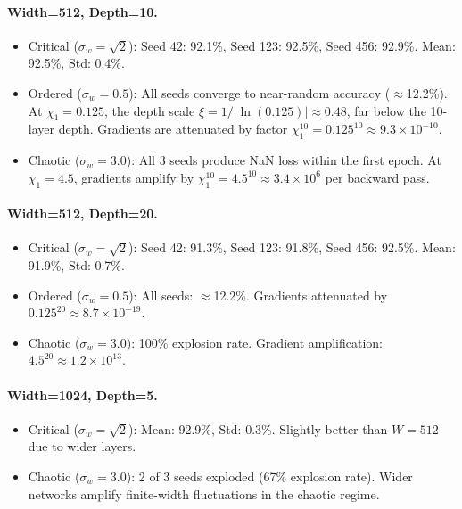 \documentclass[10pt]{article}
\begin{document}
\paragraph{Width=512, Depth=10.}
\begin{itemize}[nosep]
    \item Critical ($\sigma_w = \sqrt{2}$):
    Seed 42: 92.1\%, Seed 123: 92.5\%, Seed 456: 92.9\%.
    Mean: 92.5\%, Std: 0.4\%.
    \item Ordered ($\sigma_w = 0.5$):
    All seeds converge to near-random accuracy ($\approx$12.2\%).
    At $\chi_1 = 0.125$, the depth scale $\xi = 1/|\ln(0.125)| \approx 0.48$, far below the 10-layer depth.
    Gradients are attenuated by factor $\chi_1^{10} = 0.125^{10} \approx 9.3 \times 10^{-10}$.
    \item Chaotic ($\sigma_w = 3.0$):
    All 3 seeds produce NaN loss within the first epoch.
    At $\chi_1 = 4.5$, gradients amplify by $\chi_1^{10} = 4.5^{10} \approx 3.4 \times 10^{6}$ per backward pass.
\end{itemize}

\paragraph{Width=512, Depth=20.}
\begin{itemize}[nosep]
    \item Critical ($\sigma_w = \sqrt{2}$):
    Seed 42: 91.3\%, Seed 123: 91.8\%, Seed 456: 92.5\%.
    Mean: 91.9\%, Std: 0.7\%.
    \item Ordered ($\sigma_w = 0.5$):
    All seeds: $\approx$12.2\%.  Gradients attenuated by $0.125^{20} \approx 8.7 \times 10^{-19}$.
    \item Chaotic ($\sigma_w = 3.0$):
    100\% explosion rate.  Gradient amplification: $4.5^{20} \approx 1.2 \times 10^{13}$.
\end{itemize}

\paragraph{Width=1024, Depth=5.}
\begin{itemize}[nosep]
    \item Critical ($\sigma_w = \sqrt{2}$):
    Mean: 92.9\%, Std: 0.3\%.  Slightly better than $W\!=\!512$ due to wider layers.
    \item Chaotic ($\sigma_w = 3.0$):
    2 of 3 seeds exploded (67\% explosion rate).
    Wider networks amplify finite-width fluctuations in the chaotic regime.
\end{itemize}
\end{document}

